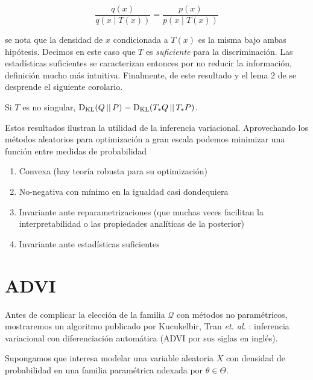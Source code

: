 \documentclass[main.tex]{subfiles}
\begin{document}
\begin{equation*}
	\frac{q(x)}{q(x\mid T(x))} = \frac{p(x)}{p(x\mid T(x))}
\end{equation*}

se nota que la densidad de $x$ condicionada a $T(x)$ es la misma bajo ambas hipótesis. Decimos en este caso que $T$ es \textit{suficiente} para la discriminación. Las estadísticas suficientes se caracterizan entonces por no reducir la información, definición mucho más intuitiva. Finalmente, de este resultado y el lema 2 de \cite{halmos1949} se desprende el siguiente corolario.

\begin{corollary}
	Si $T$ es no singular, $\operatorname*{D_{KL}}(Q \operatorname*{\mid\mid} P) = \operatorname*{D_{KL}}(T_*Q \operatorname*{\mid\mid} T_*P)$. 
\end{corollary}

Estos resultados ilustran la utilidad de la inferencia variacional. Aprovechando los métodos aleatorios para optimización a gran escala podemos minimizar una función entre medidas de probabilidad
\begin{enumerate}[label=\roman*.]
	\item Convexa (hay teoría robusta para su optimización)
	\item No-negativa con mínimo en la igualdad casi dondequiera
	\item Invariante ante reparametrizaciones (que muchas veces facilitan la interpretabilidad o las propiedades analíticas de la posterior)
	\item Invariante ante estadísticas suficientes
\end{enumerate}

\section{ADVI}
Antes de complicar la elección de la familia $\mathcal{Q}$ con métodos no paramétricos, mostraremos un algoritmo publicado por Kucukelbir, Tran \textit{et. al.} \cite{advi}: inferencia variacional con diferenciación automática (ADVI por sus siglas en inglés). 

 Supongamos que interesa modelar una variable aleatoria $X$ con densidad de probabilidad en una familia paramétrica ndexada por $\theta \in \Theta$. 
\end{document}
